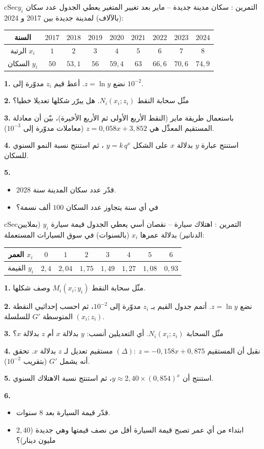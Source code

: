 \documentclass[12pt,a4paper]{article}
\newenvironment{BOX}[2]{\begin{otherlanguage}{english}\begin{arbox}{#1}{#2}}{\end{arbox}\end{otherlanguage}}
\newcounter{exo}
\newenvironment{tamrin}[1]{\stepcounter{exo}\begin{BOX}{cSec}{التمرين \theexo: #1}}{\end{BOX}}
\newenvironment{LTR}{\begin{otherlanguage}{english}}{\end{otherlanguage}}
\newcommand{\ar}[1]{\foreignlanguage{arabic}{#1}}
\newenvironment{sq}{\begin{itemize}[leftmargin=2.4em,itemsep=3pt]}{\end{itemize}}
\newcommand{\qa}{\item[(أ)]}\newcommand{\qb}{\item[(ب)]}\newcommand{\qc}{\item[(جـ)]}\newcommand{\qd}{\item[(د)]}\newcommand{\qe}{\item[(هـ)]}
\newcommand{\QQ}[1]{\par\smallskip\textbf{#1.} }
\begin{document}
\begin{tamrin}{سكان مدينة جديدة -- ماير بعد تغيير المتغير}
يعطي الجدول عدد سكان $y_i$ (بالآلاف) لمدينة جديدة بين 2017 و 2024:
\begin{center}\begin{LTR}\renewcommand{\arraystretch}{1.35}\small
\begin{tabular}{|c|c|c|c|c|c|c|c|c|}\hline
\rowcolor{cSec!12}\ar{السنة} & $2017$ & $2018$ & $2019$ & $2020$ & $2021$ & $2022$ & $2023$ & $2024$\\\hline
\ar{الرتبة} $x_i$ & $1$ & $2$ & $3$ & $4$ & $5$ & $6$ & $7$ & $8$\\\hline
\ar{السكان} $y_i$ & $50$ & $53,1$ & $56$ & $59,4$ & $63$ & $66,6$ & $70,6$ & $74,9$\\\hline
\end{tabular}\end{LTR}\end{center}
\QQ{1} نضع $z=\ln y$. أعط قيم $z_i$ مدوّرة إلى $10^{-2}$.
\QQ{2} مثّل سحابة النقط $N_i(x_i;z_i)$. هل يبرّر شكلها تعديلا خطيا؟
\QQ{3} باستعمال طريقة ماير (النقط الأربع الأولى ثم الأربع الأخيرة)، بيّن أن معادلة المستقيم المعدِّل هي \mbox{$z=0{,}058x+3{,}852$} (معاملات مدوّرة إلى $10^{-3}$).
\QQ{4} استنتج عبارة $y$ بدلالة $x$ على الشكل $y=k\,q^{x}$ ، ثم استنتج نسبة النمو السنوي للسكان.
\QQ{5}
\begin{sq}
\qa قدّر عدد سكان المدينة سنة 2028.
\qb في أي سنة يتجاوز عدد السكان $100$ ألف نسمة؟
\end{sq}
\end{tamrin}

\begin{tamrin}{اهتلاك سيارة -- نقصان أسي}
يعطي الجدول قيمة سيارة $y_i$ (بملايين الدنانير) بدلالة عمرها $x_i$ (بالسنوات) في سوق السيارات المستعملة:
\begin{center}\begin{LTR}\renewcommand{\arraystretch}{1.35}\small
\begin{tabular}{|c|c|c|c|c|c|c|c|}\hline
\rowcolor{cSec!12}\ar{العمر} $x_i$ & $0$ & $1$ & $2$ & $3$ & $4$ & $5$ & $6$\\\hline
\ar{القيمة} $y_i$ & $2,4$ & $2,04$ & $1,75$ & $1,49$ & $1,27$ & $1,08$ & $0,93$\\\hline
\end{tabular}\end{LTR}\end{center}
\QQ{1} مثّل سحابة النقط $M_i(x_i;y_i)$ وصف شكلها.
\QQ{2} نضع $z=\ln y$. أتمم جدول القيم بـ $z_i$ مدوّرة إلى $10^{-2}$، ثم احسب إحداثيي النقطة المتوسطة $G'$ للسلسلة $(x_i;z_i)$.
\QQ{3} مثّل السحابة $N_i(x_i;z_i)$. أي التعديلين أنسب: $y$ بدلالة $x$ أم $z$ بدلالة $x$؟
\QQ{4} نقبل أن المستقيم $(\Delta):\ z=-0{,}158x+0{,}875$ مستقيم تعديل لـ $z$ بدلالة $x$. تحقق أنه يشمل $G'$ (بتقريب $10^{-2}$).
\QQ{5} استنتج أن $y\approx2{,}40\times(0{,}854)^{x}$، ثم استنتج نسبة الاهتلاك السنوي.
\QQ{6}
\begin{sq}
\qa قدّر قيمة السيارة بعد $8$ سنوات.
\qb ابتداء من أي عمر تصبح قيمة السيارة أقل من نصف قيمتها وهي جديدة ($2{,}40$ مليون دينار)؟
\end{sq}
\end{tamrin}
\end{document}
